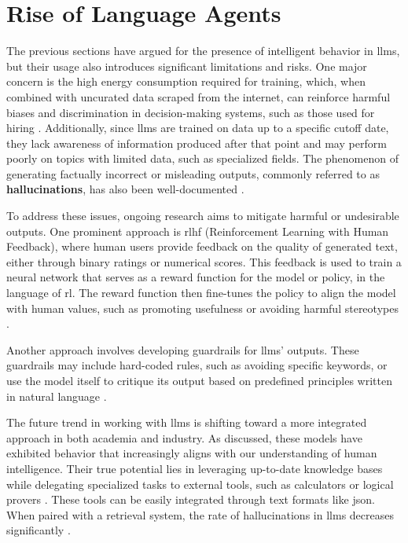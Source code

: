 \section{Rise of Language Agents}

The previous sections have argued for the presence of intelligent behavior in \glspl{llm}, but their usage also introduces significant limitations and risks. One major concern is the high energy consumption required for training, which, when combined with uncurated data scraped from the internet, can reinforce harmful biases and discrimination in decision-making systems, such as those used for hiring \cite{parrots}. Additionally, since \glspl{llm} are trained on data up to a specific cutoff date, they lack awareness of information produced after that point and may perform poorly on topics with limited data, such as specialized fields. The phenomenon of generating factually incorrect or misleading outputs, commonly referred to as \textbf{hallucinations}, has also been well-documented \cite{bai2024hallucination}.

\pskip

To address these issues, ongoing research aims to mitigate harmful or undesirable outputs. One prominent approach is \gls{rlhf} (Reinforcement Learning with Human Feedback), where human users provide feedback on the quality of generated text, either through binary ratings or numerical scores. This feedback is used to train a neural network that serves as a reward function for the model or policy, in the language of \gls{rl}. The reward function then fine-tunes the policy to align the model with human values, such as promoting usefulness or avoiding harmful stereotypes \cite{ouyang2022traininglanguagemodelsfollow}.

\pskip

Another approach involves developing guardrails for \glspl{llm}’ outputs. These guardrails may include hard-coded rules, such as avoiding specific keywords, or use the model itself to critique its output based on predefined principles written in natural language \cite{dong2024buildingguardrailslargelanguage} \cite{yuan2024rigorllmresilientguardrailslarge}.

\pskip

The future trend in working with \glspl{llm} is shifting toward a more integrated approach in both academia and industry. As discussed, these models have exhibited behavior that increasingly aligns with our understanding of human intelligence. Their true potential lies in leveraging up-to-date knowledge bases while delegating specialized tasks to external tools, such as calculators or logical provers \cite{Trinh2024}. These tools can be easily integrated through text formats like \Gls{json}. When paired with a retrieval system, the rate of hallucinations in \glspl{llm} decreases significantly \cite{ding2024survey} \cite{wang2024evaluating}. 


